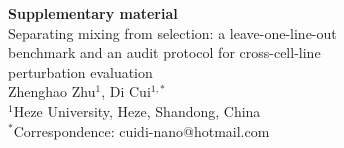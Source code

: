 \documentclass[12pt]{article}
\begin{document}
\begin{singlespace}
\begin{center}
{\Large\bfseries Supplementary material}\\[8pt]
{\large Separating mixing from selection: a leave-one-line-out\\[2pt]
benchmark and an audit protocol for cross-cell-line\\[2pt]
perturbation evaluation}\\[12pt]
{\normalsize Zhenghao Zhu$^{1}$, Di Cui$^{1,*}$}\\[4pt]
{\small $^{1}$Heze University, Heze, Shandong, China}\\[2pt]
{\small $^{*}$Correspondence: cuidi-nano@hotmail.com}
\end{center}
\end{singlespace}
\end{document}
